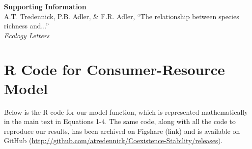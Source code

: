 \documentclass[11pt,]{article}
\title{}
\author{}
\date{}
\begin{document}
\newcommand{\tikzcircle}[2][red,fill=red]{\tikz[baseline=-0.5ex]\draw[#1,radius=#2] (0,0) circle ;}
\renewcommand\linenumberfont{\normalfont\tiny\sffamily\color{gray}}
\renewcommand\thefigure{S1-\arabic{figure}}  
\renewcommand\thetable{S1-\arabic{table}}  
\renewcommand\thesection{Section SI.\arabic{section}}

\begin{center}
\textbf{\Large{Supporting Information}} \\
A.T. Tredennick, P.B. Adler, \& F.R. Adler, ``The relationship between species richness and...'' \\
\emph{Ecology Letters}
\end{center}

\section{R Code for Consumer-Resource Model}

Below is the R code for our model function, which is represented
mathematically in the main text in Equations 1-4. The same code, along
with all the code to reproduce our results, has been archived on
Figshare (link) and is available on GitHub
(\url{http://github.com/atredennick/Coexistence-Stability/releases}).
\end{document}
